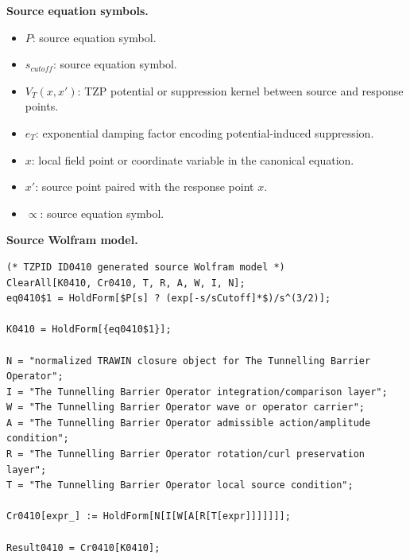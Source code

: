 \begin{minipage}[t]{0.49\linewidth}
\begingroup
\small
\raggedright
\textbf{Source equation symbols.}\par
\begin{itemize}[leftmargin=1.35em,itemsep=1pt,topsep=1pt,parsep=0pt]
    \item $P$: source equation symbol.
    \item $s_{cutoff}$: source equation symbol.
    \item $V_{T}(x,x')$: TZP potential or suppression kernel between source and response points.
    \item $e_T$: exponential damping factor encoding potential-induced suppression.
    \item $x$: local field point or coordinate variable in the canonical equation.
    \item $x'$: source point paired with the response point $x$.
    \item $\propto$: source equation symbol.
\end{itemize}
\endgroup
\end{minipage}\hfill
\begin{minipage}[t]{0.47\linewidth}
\begingroup
\scriptsize
\raggedright
\textbf{Source Wolfram model.}\par
\begin{Verbatim}[fontsize=\tiny,breaklines=true,breakanywhere=true]
(* TZPID ID0410 generated source Wolfram model *)
ClearAll[K0410, Cr0410, T, R, A, W, I, N];
eq0410$1 = HoldForm[$P[s] ? (exp[-s/sCutoff]*$)/s^(3/2)];

K0410 = HoldForm[{eq0410$1}];

N = "normalized TRAWIN closure object for The Tunnelling Barrier Operator";
I = "The Tunnelling Barrier Operator integration/comparison layer";
W = "The Tunnelling Barrier Operator wave or operator carrier";
A = "The Tunnelling Barrier Operator admissible action/amplitude condition";
R = "The Tunnelling Barrier Operator rotation/curl preservation layer";
T = "The Tunnelling Barrier Operator local source condition";

Cr0410[expr_] := HoldForm[N[I[W[A[R[T[expr]]]]]]];

Result0410 = Cr0410[K0410];
\end{Verbatim}
\endgroup
\end{minipage}

